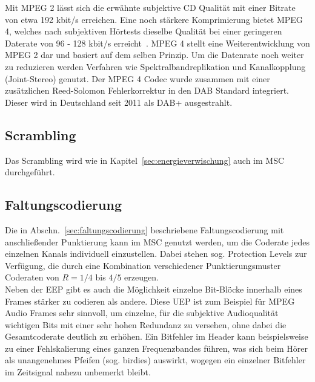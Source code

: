 Mit \ac{MPEG 2} lässt sich die erwähnte subjektive CD Qualität mit einer Bitrate von etwa 192 kbit/s erreichen. Eine noch stärkere Komprimierung bietet \ac{MPEG 4}, welches nach subjektiven Hörtests dieselbe Qualität bei einer geringeren Daterate von 96 - 128 kbit/s erreicht~\cite{mpeg:audio_tests}. \ac{MPEG 4} stellt eine Weiterentwicklung von \ac{MPEG 2} dar und basiert auf dem selben Prinzip. Um die Datenrate noch weiter zu reduzieren werden Verfahren wie Spektralbandreplikation und Kanalkopplung (Joint-Stereo) genutzt. Der \ac{MPEG 4} Codec wurde zusammen mit einer zusätzlichen Reed-Solomon Fehlerkorrektur in den DAB Standard integriert. Dieser wird in Deutschland seit 2011 als DAB+ ausgestrahlt.

\subsection{Scrambling}
Das Scrambling wird wie in Kapitel~\ref{sec:energieverwischung} auch im \ac{MSC} durchgeführt.

\subsection{Faltungscodierung}
Die in Abschn.~\ref{sec:faltungscodierung} beschriebene Faltungscodierung mit anschließender Punktierung kann im \ac{MSC} genutzt werden, um die Coderate jedes einzelnen Kanals individuell einzustellen. Dabei stehen sog. Protection Levels zur Verfügung, die durch eine Kombination verschiedener Punktierungsmuster Coderaten von $R=1/4$ bis $4/5$ erzeugen.\\
Neben der \ac{EEP} gibt es auch die Möglichkeit einzelne Bit-Blöcke innerhalb eines Frames stärker zu codieren als andere. Diese \ac{UEP} ist zum Beispiel für MPEG Audio Frames sehr sinnvoll, um einzelne, für die subjektive Audioqualität wichtigen Bits mit einer sehr hohen Redundanz zu versehen, ohne dabei die Gesamtcoderate deutlich zu erhöhen. Ein Bitfehler im Header kann beispielsweise zu einer Fehlskalierung eines ganzen Frequenzbandes führen, was sich beim Hörer als unangenehmes Pfeifen (sog. \glqq birdies\grqq{}) auswirkt, wogegen ein einzelner Bitfehler im Zeitsignal nahezu unbemerkt bleibt.

